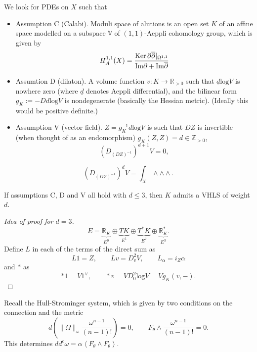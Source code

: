 We look for PDEs on  $X$ such that
\begin{itemize}
\item Assumption C (Calabi). Moduli
space of alutions is an open set $K$ 
of an affine space modelled on
a subspace $\mathbb{V}$ of
$(1,1)$-Aeppli cohomology group,
which is given by
$$
H^{1,1}_A(X)=\frac{\mathop{\mathrm{Ker}} \partial\overline{\partial}|_{\Omega^{1,1}}}
{\text{Im} \partial+\text{Im}\overline{\partial}}
$$

\item Assumtion D (dilaton).
A volume function $v:K\to \mathbb{R}_{>0}$
such that $\underline{d}\text{log} V$ 
is nowhere zero (where $\underline{d}$ denotes
Aeppli differential), and the bilinear form
$g_K:=-Dd \text{log}V$
is nondegenerate (basically the Hessian metric).
(Ideally this would be positive definite.)

\item Assumption V (vector field).
$Z=g_K^{-1}d \text{log}V$
is such that $DZ$ is invertible
(when thought of as an endomorphism)
$g_K(Z,Z)=d \in \mathbb{Z}_{>0}$,
 $$
(D_{(DZ)^{-1}})^{d+1}V=0,
$$
\end{itemize}

\begin{remark}
\label{remark-pairing}
$$
(D_{(DZ)^{-1}})^dV=\int_X \wedge \wedge \wedge.
$$
\end{remark}

\begin{theorem}
\label{theorem-GGA}
If assumptions C, D and V all hold with  $d \leq 3$,
then $K$ admits a VHLS of weight $d$.
\end{theorem}

\begin{proof}[Idea of proof for $d=3$]
$$
E=\underbrace{\mathbb{R}_K}_{E^0} \oplus \underbrace{TK}_{E^1}
\oplus \underbrace{T^*K}_{E^2} \oplus \underbrace{\mathbb{R}_K^*}_{E^3}.
$$
Define $L$ in each of the terms of the direct sum as
$$
L1=Z,\qquad Lv=D^2_vV,\qquad L_\alpha=i_Z\alpha
$$
and $*$ as
$$
*1=V 1^\vee,\qquad  *v=VD^2_0 \text{log}V=Vg_K(v,-).
$$
\end{proof}

\medskip\noindent
Recall the Hull-Strominger
system, which is given by two conditions
on the connection and the metric
$$
d\left(\|\Omega\|_\omega \frac{\omega^{n-1}}{(n-1)!}\right)=0,\qquad 
F_\theta \wedge \frac{\omega^{n-1}}{(n-1)!}=0.
$$
This determines $d d^c\omega=\alpha\left<F_\theta \wedge F_\theta\right>$.




